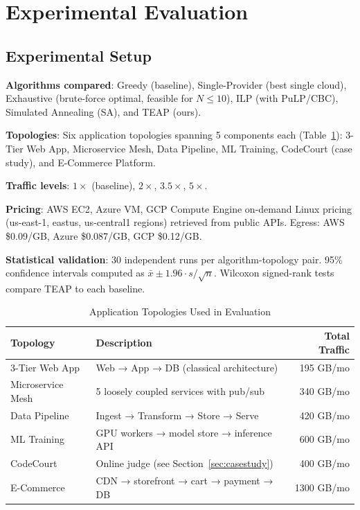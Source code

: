 \documentclass[10pt,journal,compsoc]{IEEEtran}
\begin{document}
\section{Experimental Evaluation}
\label{sec:eval}

\subsection{Experimental Setup}

\textbf{Algorithms compared}: Greedy (baseline), Single-Provider (best single
cloud), Exhaustive (brute-force optimal, feasible for $N \leq 10$), ILP (with
PuLP/CBC), Simulated Annealing (SA), and TEAP (ours).

\textbf{Topologies}: Six application topologies spanning 5 components each
(Table~\ref{tab:topologies}): 3-Tier Web App, Microservice Mesh, Data Pipeline,
ML Training, CodeCourt (case study), and E-Commerce Platform.

\textbf{Traffic levels}: $1\times$ (baseline), $2\times$, $3.5\times$, $5\times$.

\textbf{Pricing}: AWS EC2, Azure VM, GCP Compute Engine on-demand Linux
pricing (us-east-1, eastus, us-central1 regions) retrieved from public APIs.
Egress: AWS \$0.09/GB, Azure \$0.087/GB, GCP \$0.12/GB.

\textbf{Statistical validation}: 30 independent runs per algorithm-topology
pair. 95\% confidence intervals computed as $\bar{x} \pm 1.96 \cdot s /
\sqrt{n}$.
Wilcoxon signed-rank tests compare TEAP to each baseline.

\begin{table}[ht]
\centering
\caption{Application Topologies Used in Evaluation}
\label{tab:topologies}
\begin{tabularx}{\columnwidth}{lXr}
\toprule
Topology & Description & Total Traffic \\
\midrule
3-Tier Web App   & Web → App → DB (classical architecture) & 195 GB/mo \\
Microservice Mesh & 5 loosely coupled services with pub/sub & 340 GB/mo \\
Data Pipeline    & Ingest → Transform → Store → Serve & 420 GB/mo \\
ML Training      & GPU workers → model store → inference API & 600 GB/mo \\
CodeCourt        & Online judge (see Section~\ref{sec:casestudy}) & 400 GB/mo \\
E-Commerce       & CDN → storefront → cart → payment → DB & 1300 GB/mo \\
\bottomrule
\end{tabularx}
\end{table}
\end{document}

